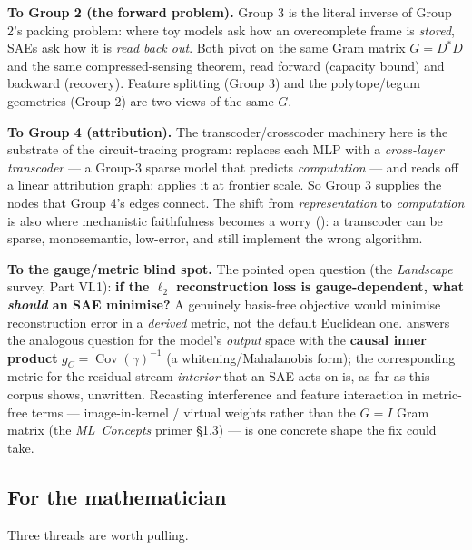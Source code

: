 \textbf{To Group 2 (the forward problem).} Group 3 is the literal inverse of Group 2's packing problem: where toy models ask how an overcomplete frame is \emph{stored}, SAEs ask how it is \emph{read back out}. Both pivot on the same Gram matrix $G=D^{*}D$ and the same compressed-sensing theorem, read forward (capacity bound) and backward (recovery). Feature splitting (Group 3) and the polytope/tegum geometries (Group 2) are two views of the same $G$.

\textbf{To Group 4 (attribution).} The transcoder/crosscoder machinery here is the substrate of the circuit-tracing program: \textcite{circuit-tracing-computational-graphs} replaces each MLP with a \emph{cross-layer transcoder} --- a Group-3 sparse model that predicts \emph{computation} --- and reads off a linear attribution graph; \textcite{on-the-biology-of-a-large-language-model} applies it at frontier scale. So Group 3 supplies the nodes that Group 4's edges connect. The shift from \emph{representation} to \emph{computation} is also where mechanistic faithfulness becomes a worry (\textcite{toy-model-of-mechanistic-unfaithfulness}): a transcoder can be sparse, monosemantic, low-error, and still implement the wrong algorithm.

\textbf{To the gauge/metric blind spot.} The pointed open question (the \emph{Landscape} survey, Part VI.1): \textbf{if the $\ell_2$ reconstruction loss is gauge-dependent, what \emph{should} an SAE minimise?} A genuinely basis-free objective would minimise reconstruction error in a \emph{derived} metric, not the default Euclidean one. \textcite{linear-representation-hypothesis-geometry} answers the analogous question for the model's \emph{output} space with the \textbf{causal inner product} $g_C=\operatorname{Cov}(\gamma)^{-1}$ (a whitening/Mahalanobis form); the corresponding metric for the residual-stream \emph{interior} that an SAE acts on is, as far as this corpus shows, unwritten. Recasting interference and feature interaction in metric-free terms --- image-in-kernel / virtual weights rather than the $G=I$ Gram matrix (the \emph{ML~Concepts} primer §1.3) --- is one concrete shape the fix could take.

\subsection*{For the mathematician}

Three threads are worth pulling.

